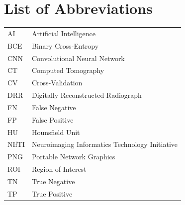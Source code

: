 \chapter*{List of Abbreviations}

\begin{tabular}{ll}
AI & Artificial Intelligence \\
BCE & Binary Cross-Entropy \\
CNN & Convolutional Neural Network \\
CT & Computed Tomography \\
CV & Cross-Validation \\
DRR & Digitally Reconstructed Radiograph \\
FN & False Negative \\
FP & False Positive \\
HU & Hounsfield Unit \\
NIfTI & Neuroimaging Informatics Technology Initiative \\
PNG & Portable Network Graphics \\
ROI & Region of Interest \\
TN & True Negative \\
TP & True Positive \\
\end{tabular}
